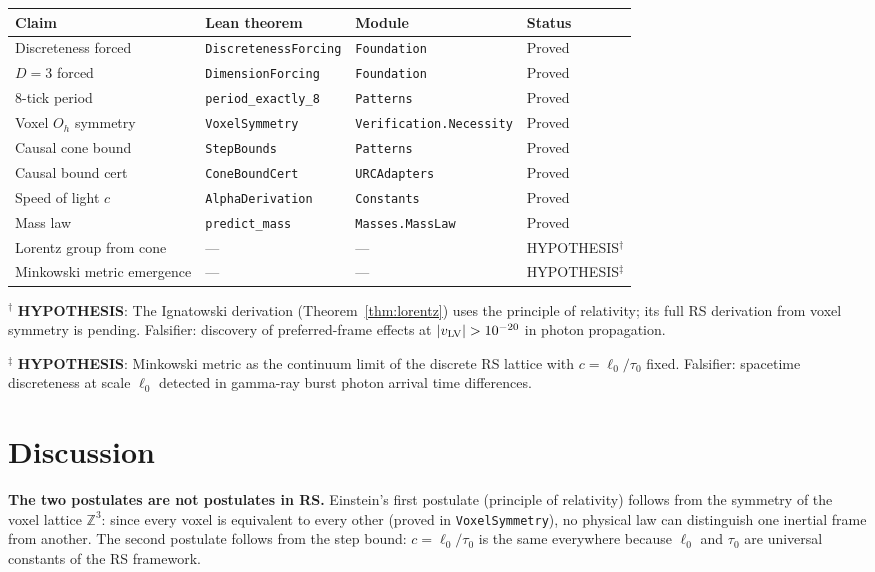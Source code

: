 \documentclass[12pt,a4paper]{article}
\theoremstyle{definition}
\theoremstyle{remark}
\begin{document}
\begin{center}
\begin{tabular}{llll}
\toprule
Claim & Lean theorem & Module & Status \\
\midrule
Discreteness forced & \texttt{DiscretenessForcing} & \texttt{Foundation} & Proved \\
$D=3$ forced & \texttt{DimensionForcing} & \texttt{Foundation} & Proved \\
8-tick period & \texttt{period\_exactly\_8} & \texttt{Patterns} & Proved \\
Voxel $O_h$ symmetry & \texttt{VoxelSymmetry} & \texttt{Verification.Necessity} & Proved \\
Causal cone bound & \texttt{StepBounds} & \texttt{Patterns} & Proved \\
Causal bound cert & \texttt{ConeBoundCert} & \texttt{URCAdapters} & Proved \\
Speed of light $c$ & \texttt{AlphaDerivation} & \texttt{Constants} & Proved \\
Mass law & \texttt{predict\_mass} & \texttt{Masses.MassLaw} & Proved \\
\midrule
Lorentz group from cone & --- & --- & HYPOTHESIS$^\dagger$ \\
Minkowski metric emergence & --- & --- & HYPOTHESIS$^\ddagger$ \\
\bottomrule
\end{tabular}
\end{center}

$^\dagger$ \textbf{HYPOTHESIS}: The Ignatowski derivation (Theorem~\ref{thm:lorentz})
uses the principle of relativity; its full RS derivation from voxel symmetry
is pending. Falsifier: discovery of preferred-frame effects at $|v_{\rm LV}|
> 10^{-20}$ in photon propagation.

$^\ddagger$ \textbf{HYPOTHESIS}: Minkowski metric as the continuum limit of the
discrete RS lattice with $c = \ell_0/\tau_0$ fixed. Falsifier: spacetime
discreteness at scale $\ell_0$ detected in gamma-ray burst photon arrival
time differences.

\section{Discussion}
\label{sec:discussion}

\textbf{The two postulates are not postulates in RS.}
Einstein's first postulate (principle of relativity) follows from the
symmetry of the voxel lattice $\mathbb{Z}^3$: since every voxel is
equivalent to every other (proved in \texttt{VoxelSymmetry}), no physical
law can distinguish one inertial frame from another.  The second postulate
follows from the step bound: $c = \ell_0/\tau_0$ is the same everywhere
because $\ell_0$ and $\tau_0$ are universal constants of the RS framework.
\end{document}
